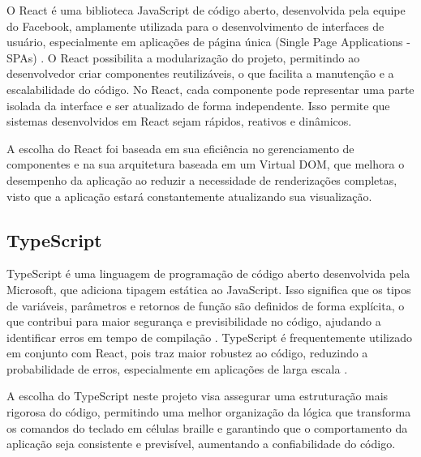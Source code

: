 O React é uma biblioteca JavaScript de código aberto, desenvolvida pela equipe do Facebook, amplamente utilizada para o desenvolvimento de interfaces de usuário, especialmente em aplicações de página única (Single Page Applications - SPAs) \parencite{SITE03}. O React possibilita a modularização do projeto, permitindo ao desenvolvedor criar componentes reutilizáveis, o que facilita a manutenção e a escalabilidade do código. No React, cada componente pode representar uma parte isolada da interface e ser atualizado de forma independente. Isso permite que sistemas desenvolvidos em React sejam rápidos, reativos e dinâmicos.

A escolha do React foi baseada em sua eficiência no gerenciamento de componentes e na sua arquitetura baseada em um Virtual DOM, que melhora o desempenho da aplicação ao reduzir a necessidade de renderizações completas, visto que a aplicação estará constantemente atualizando sua visualização.

\subsection{TypeScript}

TypeScript é uma linguagem de programação de código aberto desenvolvida pela Microsoft, que adiciona tipagem estática ao JavaScript. Isso significa que os tipos de variáveis, parâmetros e retornos de função são definidos de forma explícita, o que contribui para maior segurança e previsibilidade no código, ajudando a identificar erros em tempo de compilação \parencite{SITE04}. TypeScript é frequentemente utilizado em conjunto com React, pois traz maior robustez ao código, reduzindo a probabilidade de erros, especialmente em aplicações de larga escala \parencite{SITE03}.

A escolha do TypeScript neste projeto visa assegurar uma estruturação mais rigorosa do código, permitindo uma melhor organização da lógica que transforma os comandos do teclado em células braille e garantindo que o comportamento da aplicação seja consistente e previsível, aumentando a confiabilidade do código.


